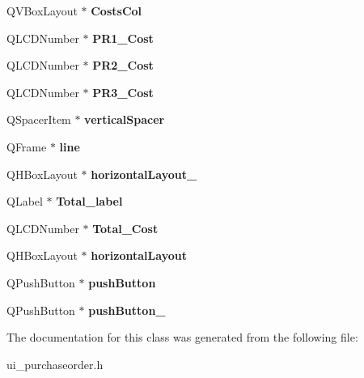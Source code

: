 \begin{DoxyCompactItemize}
\item 
\mbox{\label{class_ui___purchase_order_a0d460f181626f93a70e4d7d213aa86b5}} 
Q\+V\+Box\+Layout $\ast$ {\bfseries Costs\+Col}
\item 
\mbox{\label{class_ui___purchase_order_a9b52050db058915b2ca9e51b7b72e47b}} 
Q\+L\+C\+D\+Number $\ast$ {\bfseries P\+R1\+\_\+\+Cost}
\item 
\mbox{\label{class_ui___purchase_order_acbabc9c4ce51600cccbfd7af092a3aad}} 
Q\+L\+C\+D\+Number $\ast$ {\bfseries P\+R2\+\_\+\+Cost}
\item 
\mbox{\label{class_ui___purchase_order_a734b09b4b6d5de6ad14aa47b01b8dd24}} 
Q\+L\+C\+D\+Number $\ast$ {\bfseries P\+R3\+\_\+\+Cost}
\item 
\mbox{\label{class_ui___purchase_order_a3974bccf2b5883aed41b1c45fcc51759}} 
Q\+Spacer\+Item $\ast$ {\bfseries vertical\+Spacer}
\item 
\mbox{\label{class_ui___purchase_order_a68e5a64e5139fe78fe8c6a2592636548}} 
Q\+Frame $\ast$ {\bfseries line}
\item 
\mbox{\label{class_ui___purchase_order_a22b1dd37e883022dfa4bef304265c4e1}} 
Q\+H\+Box\+Layout $\ast$ {\bfseries horizontal\+Layout\+\_}
\item 
\mbox{\label{class_ui___purchase_order_a0164494322b815fd92bb7578d5e99bd2}} 
Q\+Label $\ast$ {\bfseries Total\+\_\+label}
\item 
\mbox{\label{class_ui___purchase_order_ab64257d988dd329b6854fec968f5e1ce}} 
Q\+L\+C\+D\+Number $\ast$ {\bfseries Total\+\_\+\+Cost}
\item 
\mbox{\label{class_ui___purchase_order_a9c2a5af9b6472e625d02c156ddfbf007}} 
Q\+H\+Box\+Layout $\ast$ {\bfseries horizontal\+Layout}
\item 
\mbox{\label{class_ui___purchase_order_a1feed62f700c6d340877da2d7e66357e}} 
Q\+Push\+Button $\ast$ {\bfseries push\+Button}
\item 
\mbox{\label{class_ui___purchase_order_a9ff91f8897c1b0330ac0643a44e6081d}} 
Q\+Push\+Button $\ast$ {\bfseries push\+Button\+\_}
\end{DoxyCompactItemize}


The documentation for this class was generated from the following file\+:\begin{DoxyCompactItemize}
\item 
ui\+\_\+purchaseorder.\+h\end{DoxyCompactItemize}

